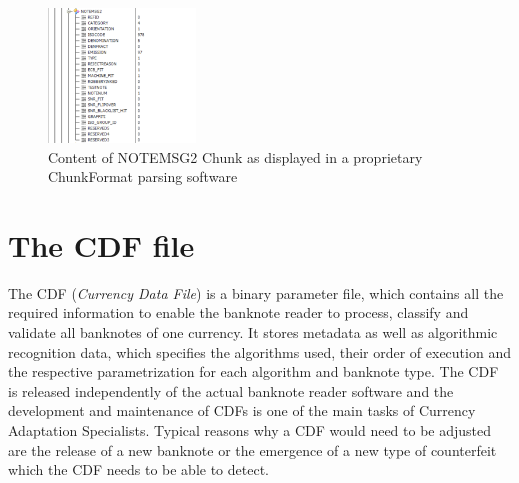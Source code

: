\begin{figure}
\includegraphics[width=0.35\textwidth]{images/NoteMsg2Chunk}
  \caption{Content of NOTEMSG2 Chunk as displayed in a proprietary ChunkFormat parsing software}\label{fig:notemsg2}
\end{figure}

\section{The CDF file}
The CDF (\emph{Currency Data File}) is a binary parameter file, which contains all the required information to enable the banknote reader to process, classify and validate all banknotes of one currency. It stores metadata as well as algorithmic recognition data, which specifies the algorithms used, their order of execution and the respective parametrization for each algorithm and banknote type. The CDF is released independently of the actual banknote reader software and the development and maintenance of CDFs is one of the main tasks of Currency Adaptation Specialists. Typical reasons why a CDF would need to be adjusted are the release of a new banknote or the emergence of a new type of counterfeit which the CDF needs to be able to detect.

